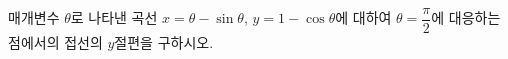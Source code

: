 매개변수 $\theta$로 나타낸 곡선 $x=\theta-\sin\theta$, $y=1-\cos\theta$에 대하여 $\theta=\dfrac{\pi}{2}$에 대응하는 점에서의 접선의 $y$절편을 구하시오.
